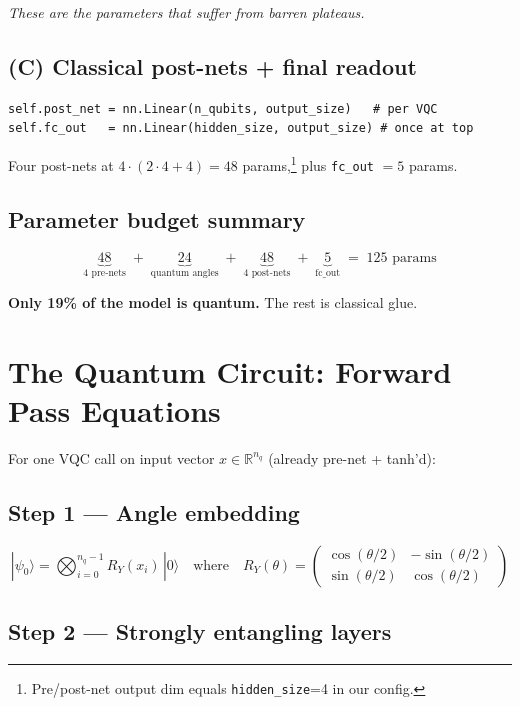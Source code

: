\documentclass[11pt,a4paper]{article}
\begin{document}
\textit{These are the parameters that suffer from barren plateaus.}

\subsection{(C) Classical post-nets + final readout}

\begin{lstlisting}
self.post_net = nn.Linear(n_qubits, output_size)   # per VQC
self.fc_out   = nn.Linear(hidden_size, output_size) # once at top
\end{lstlisting}

Four post-nets at $4 \cdot (2 \cdot 4 + 4) = 48$ params,\footnote{Pre/post-net output dim equals \texttt{hidden\_size}=4 in our config.} plus \texttt{fc\_out} $= 5$ params.

\subsection{Parameter budget summary}

\[
\underbrace{48}_{\text{4 pre-nets}} \;+\; \underbrace{24}_{\text{quantum angles}} \;+\; \underbrace{48}_{\text{4 post-nets}} \;+\; \underbrace{5}_{\text{fc\_out}} \;=\; \boxed{125 \text{ params}}
\]

\textbf{Only 19\% of the model is quantum.} The rest is classical glue.

\section{The Quantum Circuit: Forward Pass Equations}

For one VQC call on input vector $x \in \mathbb{R}^{n_q}$ (already pre-net + tanh'd):

\subsection{Step 1 --- Angle embedding}

\[
  |\psi_0\rangle = \bigotimes_{i=0}^{n_q - 1} R_Y(x_i)\,|0\rangle
  \quad\text{where}\quad
  R_Y(\theta) = \begin{pmatrix}\cos(\theta/2) & -\sin(\theta/2)\\ \sin(\theta/2) & \cos(\theta/2)\end{pmatrix}
\]

\subsection{Step 2 --- Strongly entangling layers}
\end{document}
